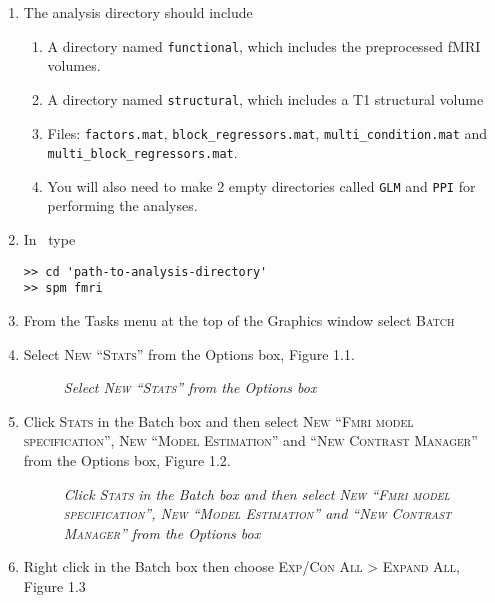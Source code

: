 \begin{enumerate}
\item The analysis directory should include
\begin{enumerate}
\item A directory named \texttt{functional}, which includes the preprocessed fMRI volumes.
\item A directory named \texttt{structural}, which includes a T1 structural volume
\item Files: \texttt{factors.mat}, \texttt{block\_regressors.mat}, \texttt{multi\_condition.mat} and \texttt{multi\_block\_regressors.mat}.
\item You will also need to make 2 empty directories called \texttt{GLM} and \texttt{PPI} for performing the analyses.
\end{enumerate}

\item In \matlab\ type
\begin{verbatim}
>> cd 'path-to-analysis-directory'
>> spm fmri
\end{verbatim}
\item From the Tasks menu at the top of the Graphics window select \textsc{Batch}
\item Select \textsc{New ``Stats''} from the Options box, Figure 1.1.

\begin{figure}[!ht]
\centering{}
\caption{\em Select \textsc{New ``Stats''} from the Options box}
\label{ppi_fig1}
\end{figure}

\item Click \textsc{Stats} in the Batch box and then select \textsc{New ``Fmri model specification''}, \textsc{New ``Model Estimation''} and \textsc{``New Contrast Manager''} from the Options box, Figure 1.2.

\begin{figure}[ht]
\centering{}
\caption{\em Click \textsc{Stats} in the Batch box and then select \textsc{New ``Fmri model specification''}, \textsc{New ``Model Estimation''} and \textsc{``New Contrast Manager''} from the Options box}
\label{ppi_fig2}
\end{figure}

\item Right click in the Batch box then choose \textsc{Exp/Con All > Expand All}, Figure 1.3\\\\


\end{enumerate}
